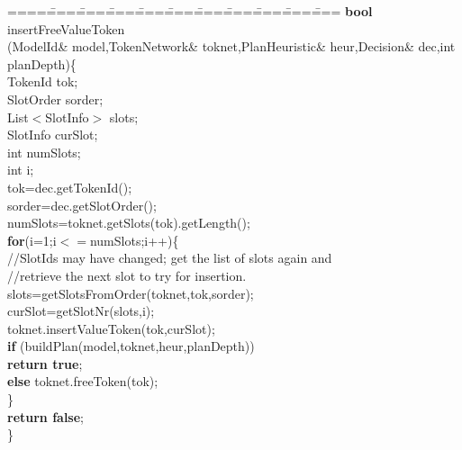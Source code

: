 \begin{tabbing}
====\====\====\====\====\====\====\====\====\====\====\kill
{\bf bool} insertFreeValueToken\\
\> \> (ModelId\& model,TokenNetwork\& toknet,PlanHeuristic\& heur,Decision\& dec,int planDepth)\{\\
\>    TokenId tok;\\
\>    SlotOrder sorder;\\
\>    List$<$SlotInfo$>$ slots;\\
\>    SlotInfo curSlot;\\
\>    int numSlots;\\
\>    int i;\\
\>    tok=dec.getTokenId();\\
\>    sorder=dec.getSlotOrder();\\
\>    numSlots=toknet.getSlots(tok).getLength();\\
\>    {\bf for}(i=1;i$<=$numSlots;i++)\{ \\
\>\>        //SlotIds may have changed; get the list of slots again and\\
\>\>        //retrieve the next slot to try for insertion.\\
\>\>        slots=getSlotsFromOrder(toknet,tok,sorder);\\
\>\>        curSlot=getSlotNr(slots,i);\\  
\>\>        toknet.insertValueToken(tok,curSlot);\\
\>\>        {\bf if} (buildPlan(model,toknet,heur,planDepth)) \\
\>\> \>               {\bf return true};\\
\>\>        {\bf else} toknet.freeToken(tok);\\
\>\>    \}\\
\>    {\bf return false};\\
\}
\end{tabbing}
\newpage

